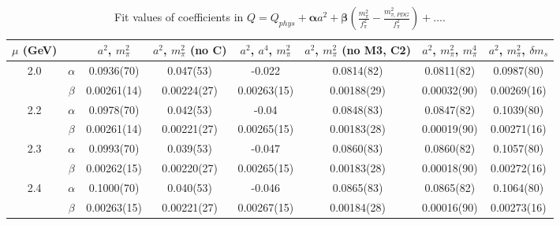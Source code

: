 \documentclass[12pt]{extarticle}
\begin{document}
\begin{table}[h!]
\begin{center}
\begin{tabular}{|c c|c|c|c|c|c|c|}
\hline
$\mu$ (GeV) &  & $a^2$, $m_\pi^2$& $a^2$, $m_\pi^2$ (no C)& $a^2$, $a^4$, $m_\pi^2$& $a^2$, $m_\pi^2$ (no M3, C2)& $a^2$, $m_\pi^2$, $m_\pi^4$& $a^2$, $m_\pi^2$, $\delta m_s$\\
\hline
\multirow{2}{0.5in}{2.0} & $\alpha$ & 0.0936(70)& 0.047(53)& -0.022& 0.0814(82)& 0.0811(82)& 0.0987(80)\\
 & $\beta$ & 0.00261(14)& 0.00224(27)& 0.00263(15)& 0.00188(29)& 0.00032(90)& 0.00269(16)\\
\hline
\multirow{2}{0.5in}{2.2} & $\alpha$ & 0.0978(70)& 0.042(53)& -0.04& 0.0848(83)& 0.0847(82)& 0.1039(80)\\
 & $\beta$ & 0.00261(14)& 0.00221(27)& 0.00265(15)& 0.00183(28)& 0.00019(90)& 0.00271(16)\\
\hline
\multirow{2}{0.5in}{2.3} & $\alpha$ & 0.0993(70)& 0.039(53)& -0.047& 0.0860(83)& 0.0860(82)& 0.1057(80)\\
 & $\beta$ & 0.00262(15)& 0.00220(27)& 0.00265(15)& 0.00183(28)& 0.00018(90)& 0.00272(16)\\
\hline
\multirow{2}{0.5in}{2.4} & $\alpha$ & 0.1000(70)& 0.040(53)& -0.046& 0.0865(83)& 0.0865(82)& 0.1064(80)\\
 & $\beta$ & 0.00263(15)& 0.00221(27)& 0.00267(15)& 0.00184(28)& 0.00016(90)& 0.00273(16)\\
\hline
\end{tabular}
\caption{Fit values of coefficients in $Q = Q_{phys} + \mathbf{\alpha} a^2 + \mathbf{\beta}\left(\frac{m_\pi^2}{f_\pi^2}-\frac{m_{\pi,PDG}^2}{f_\pi^2}\right) + \ldots$.}
\end{center}
\end{table}
























\clearpage
\end{document}
